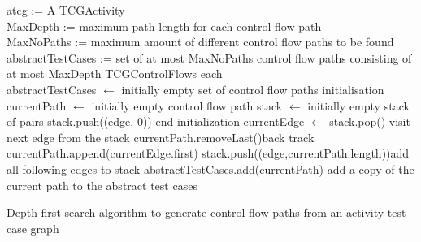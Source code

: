 \begin{algorithm}
\begin{algorithmic}
\Require atcg := A TCGActivity \\
MaxDepth := maximum path length for each control flow path \\
MaxNoPaths := maximum amount of different control flow paths to be found
\Ensure abstractTestCases := set of at most MaxNoPaths control flow paths consisting of at most MaxDepth TCGControlFlows each\\
\State abstractTestCases $\gets$ initially empty set of control flow paths \Comment initialisation
\State currentPath $\gets$ initially empty control flow path
\State stack $\gets$ initially empty stack of pairs
\State stack.push((edge, 0))
\EndFor \Comment end initialization
\State currentEdge $\gets$ stack.pop() \Comment visit next edge from the stack
\State currentPath.removeLast()\Comment back track
\EndWhile
\State currentPath.append(currentEdge.first)
\State stack.push((edge,currentPath.length))\Comment add all following edges to stack
\EndFor
\EndIf
{}
\State abstractTestCases.add(currentPath) \Comment add a copy of the current path to the abstract test cases
\EndIf
\EndWhile
\end{algorithmic}
\caption{Depth first search algorithm to generate control flow paths from an activity test case graph}
\label{alg:DepthFirstSearch}
\end{algorithm}
